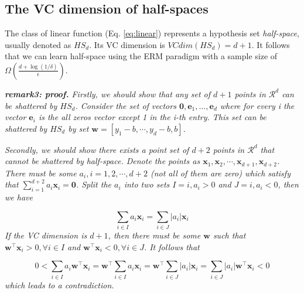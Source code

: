\documentclass{article}
\begin{document}
	\subsection{The VC dimension of half-spaces}
	
	The class of linear function (Eq. \ref{eq:linear}) represents a hypothesis set  \textit{half-space}, usually denoted as $HS_d$. Its VC dimension is $VCdim(HS_d)=d+1$.  It follows that we can learn half-space using the ERM paradigm with a sample size of $\Omega(\frac{d+\log(1/\delta)}{\epsilon})$. 

	\begin{framed}
	\begin{scriptsize}
	\begin{spacing}{1.2}
	\noindent\textit{\textbf{remark3: proof.} Firstly, we should show that any set of $d+1$ points in $\mathcal{R}^d$ can be shattered by $HS_d$. Consider the set of vectors $\mathbf{0}, \mathbf{e}_1, ..., \mathbf{e}_d$ where for every i the vector $\mathbf{e}_i$ is the all zeros vector except 1 in the i-th entry. This set can be shattered by $HS_d$ by set $\mathbf{w}=[y_1-b,\cdots,y_d-b,b]$.}
	
	\textit{Secondly, we should show there exists a point set of $d+2$ points in $\mathcal{R}^{d}$ that cannot be shattered by half-space. Denote the points as $\mathbf{x}_1, \mathbf{x}_2, \cdots, \mathbf{x}_{d+1}, \mathbf{x}_{d+2}$. There must be some $a_i, i=1,2,\cdots,d+2$ (not all of them are zero) which satisfy that $\sum_{i=1}^{d+2} a_i \mathbf{x}_i = \mathbf{0}$. Split the $a_i$ into two sets $I={i,a_i>0}$ and $J={i,a_i<0}$, then we have }
	
	\begin{equation*}
	\sum_{i\in I} a_i \mathbf{x}_i = \sum_{i \in J} |a_i| \mathbf{x}_i
	\end{equation*}
	\textit{If the VC dimension is $d+1$, then there must be some $\mathbf{w}$ such that $\mathbf{w}^\top \mathbf{x}_i > 0, \forall i \in I$ and $\mathbf{w}^\top \mathbf{x}_i < 0, \forall i \in J$. It follows that}
	
	\begin{equation*}
	0 < \sum_{i \in I} a_i \mathbf{w}^\top \mathbf{x}_i = \mathbf{w}^\top  \sum_{i \in I} a_i \mathbf{x}_i = \mathbf{w}^\top  \sum_{i \in J} |a_i| \mathbf{x}_i =  \sum_{i \in J} |a_i| \mathbf{w}^\top \mathbf{x}_i  < 0
	\end{equation*}
	\noindent\textit{which leads to a contradiction.}
	\end{spacing}
	\end{scriptsize}
	\end{framed}
	
\end{document}
